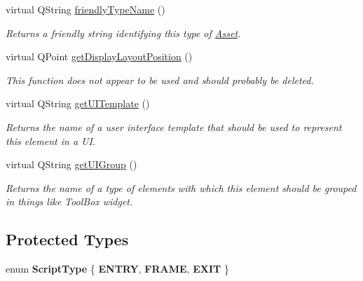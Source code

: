 \begin{DoxyCompactItemize}
virtual Q\-String \hyperlink{class_picto_1_1_state_machine_element_a71bb8021124ed8ce64e498e767b69e1d}{friendly\-Type\-Name} ()
\begin{DoxyCompactList}\small\item\em Returns a friendly string identifying this type of \hyperlink{class_picto_1_1_asset}{Asset}. \end{DoxyCompactList}\item 
\hypertarget{class_picto_1_1_state_machine_element_aec86d290ec5146f0653465202433bc8f}{virtual Q\-Point \hyperlink{class_picto_1_1_state_machine_element_aec86d290ec5146f0653465202433bc8f}{get\-Display\-Layout\-Position} ()}\label{class_picto_1_1_state_machine_element_aec86d290ec5146f0653465202433bc8f}

\begin{DoxyCompactList}\small\item\em This function does not appear to be used and should probably be deleted. \end{DoxyCompactList}\item 
\hypertarget{class_picto_1_1_state_machine_element_a99ddc558d6c8b174e4011ec09f0d3afb}{virtual Q\-String \hyperlink{class_picto_1_1_state_machine_element_a99ddc558d6c8b174e4011ec09f0d3afb}{get\-U\-I\-Template} ()}\label{class_picto_1_1_state_machine_element_a99ddc558d6c8b174e4011ec09f0d3afb}

\begin{DoxyCompactList}\small\item\em Returns the name of a user interface template that should be used to represent this element in a U\-I. \end{DoxyCompactList}\item 
\hypertarget{class_picto_1_1_state_machine_element_adf8500aacc3be49e23e69a8e39857f92}{virtual Q\-String \hyperlink{class_picto_1_1_state_machine_element_adf8500aacc3be49e23e69a8e39857f92}{get\-U\-I\-Group} ()}\label{class_picto_1_1_state_machine_element_adf8500aacc3be49e23e69a8e39857f92}

\begin{DoxyCompactList}\small\item\em Returns the name of a type of elements with which this element should be grouped in things like Tool\-Box widget. \end{DoxyCompactList}\end{DoxyCompactItemize}
\subsection*{Protected Types}
\begin{DoxyCompactItemize}
\item 
enum {\bfseries Script\-Type} \{ {\bfseries E\-N\-T\-R\-Y}, 
{\bfseries F\-R\-A\-M\-E}, 
{\bfseries E\-X\-I\-T}
 \}
\end{DoxyCompactItemize}
